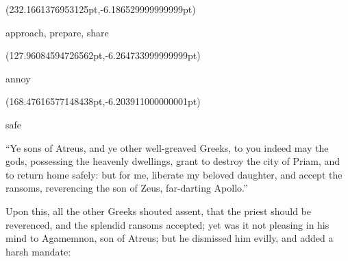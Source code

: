 \documentclass{ransom}
\begin{document}
\begin{foreignpage}
{\begin{textblock*}{54.36798pt}(232.1661376953125pt,\pdfpageheight-179.37759399414062pt-6.186529999999999pt)\parbox[b]{54.36798pt}{\begin{blacktext}\begin{latin}approach, prepare, share\end{latin}\end{blacktext}}\end{textblock*}
\begin{textblock*}{33.7007pt}(127.96084594726562pt,\pdfpageheight-152.37759399414062pt-6.264733999999999pt)\parbox[b]{33.7007pt}{\begin{blacktext}\begin{latin}annoy\end{latin}\end{blacktext}}\end{textblock*}
\begin{textblock*}{49.53941pt}(168.47616577148438pt,\pdfpageheight-152.37759399414062pt-6.203911000000001pt)\parbox[b]{49.53941pt}{\begin{blacktext}\begin{latin}safe\end{latin}\end{blacktext}}\end{textblock*}
 }
\end{foreignpage}


“Ye sons of Atreus, and ye other well-greaved Greeks, to you indeed may
the gods, possessing the heavenly dwellings, grant to destroy the city
of Priam, and to return home safely: but for me, liberate my beloved
daughter, and accept the ransoms, reverencing the son of Zeus,
far-darting Apollo.”



Upon this, all the other Greeks shouted assent, that the priest should
be reverenced, and the splendid ransoms accepted; yet was it not
pleasing in his mind to Agamemnon, son of Atreus; but he dismissed him
evilly, and added a harsh mandate:
\end{document}
